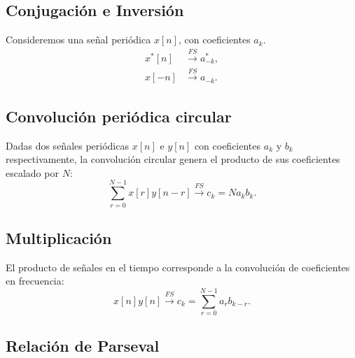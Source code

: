 \documentclass[11pt,a4paper,openany]{book}
\begin{document}
\subsection{Conjugación e Inversión}

Consideremos una señal periódica $x[n]$, con coeficientes $a_{k}$. 
\begin{align}
	x^*[n] &\xrightarrow{FS} a_{-k}^*, \\
	x[-n] &\xrightarrow{FS} a_{-k}.
\end{align}

\subsection{Convolución periódica circular}

Dadas dos señales periódicas $x[n]$ e $y[n]$ con coeficientes $a_k$ y $b_k$ respectivamente, la convolución circular genera el producto de sus coeficientes escalado por $N$:
\begin{equation}
	\sum_{r=0}^{N-1} x[r] y[n-r] \xrightarrow{FS} c_{k} = N a_{k} b_{k}.
\end{equation}

\subsection{Multiplicación}

El producto de señales en el tiempo corresponde a la convolución de coeficientes en frecuencia:
\begin{equation}
	x[n] y[n] \xrightarrow{FS} c_{k} = \sum_{r=0}^{N-1} a_{r} b_{k-r}.
\end{equation}

\subsection{Relación de Parseval}
\end{document}

